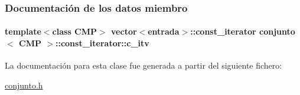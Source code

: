 \subsubsection{Documentación de los datos miembro}
\hypertarget{classconjunto_1_1const__iterator_ac5c268b217a387100ff1e562b80cf1e0}{
\paragraph[{c\-\_\-itv}]{\setlength{\rightskip}{0pt plus 5cm}template$<$class C\-M\-P$>$ vector$<${\bf entrada}$>$\-::{\bf const\-\_\-iterator} {\bf conjunto}$<$ C\-M\-P $>$\-::const\-\_\-iterator\-::c\-\_\-itv\hspace{0.3cm}{\ttfamily [private]}}}\label{classconjunto_1_1const__iterator_ac5c268b217a387100ff1e562b80cf1e0}


La documentación para esta clase fue generada a partir del siguiente fichero\-:\begin{DoxyCompactItemize}
\item 
\hyperlink{conjunto_8h}{conjunto.\-h}\end{DoxyCompactItemize}
